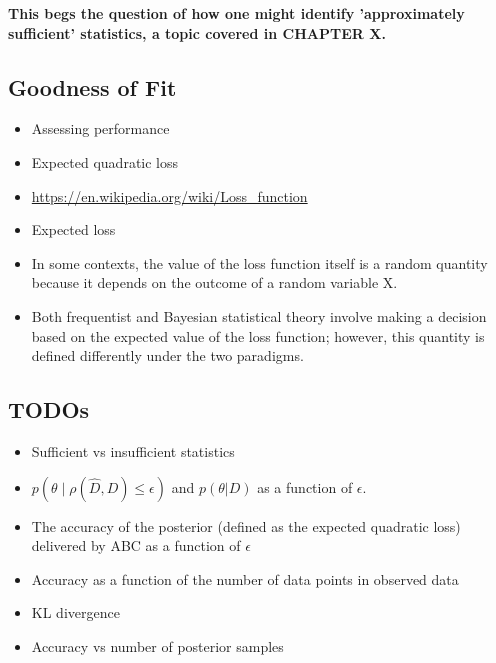 \textbf{This begs the question of how one might identify 'approximately sufficient' statistics, a topic covered in CHAPTER X.}

\subsection{Goodness of Fit}

\begin{itemize}
    \item Assessing performance 
    \item Expected quadratic loss
    \item \url{https://en.wikipedia.org/wiki/Loss_function}
    \item Expected loss
    \item In some contexts, the value of the loss function itself is a random quantity because it depends on the outcome of a random variable X.
    \item Both frequentist and Bayesian statistical theory involve making a decision based on the expected value of the loss function; however, this quantity is defined differently under the two paradigms.
\end{itemize}

\subsection{TODOs}

\begin{itemize}
    \item Sufficient vs insufficient statistics 
    \item $p(\theta \mid \rho (\hat{D}, D) \leq \epsilon)$ and $p(\theta |D)$ as a function of $\epsilon$. 
    \item The accuracy of the posterior (defined as the expected quadratic loss) delivered by ABC as a function of $\epsilon$
    \item Accuracy as a function of the number of data points in observed data
    \item KL divergence
    \item Accuracy vs number of posterior samples
\end{itemize}
